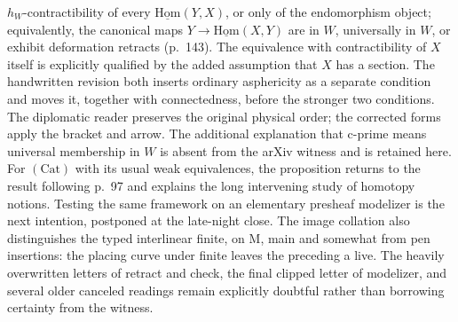 $h_W$-contractibility of every $\underline{\mathrm{Hom}}(Y,X)$, or only of the endomorphism object; equivalently, the canonical maps $Y\to\underline{\mathrm{Hom}}(X,Y)$ are in $W$, universally in $W$, or exhibit deformation retracts (p.~143). The equivalence with contractibility of $X$ itself is explicitly qualified by the added assumption that $X$ has a section. The handwritten revision both inserts ordinary asphericity as a separate condition and moves it, together with connectedness, before the stronger two conditions. The diplomatic reader preserves the original physical order; the corrected forms apply the bracket and arrow. The additional explanation that c-prime means universal membership in $W$ is absent from the arXiv witness and is retained here. For $(\mathrm{Cat})$ with its usual weak equivalences, the proposition returns to the result following p.~97 and explains the long intervening study of homotopy notions. Testing the same framework on an elementary presheaf modelizer is the next intention, postponed at the late-night close. The image collation also distinguishes the typed interlinear finite, on M, main and somewhat from pen insertions: the placing curve under finite leaves the preceding a live. The heavily overwritten letters of retract and check, the final clipped letter of modelizer, and several older canceled readings remain explicitly doubtful rather than borrowing certainty from the witness.

